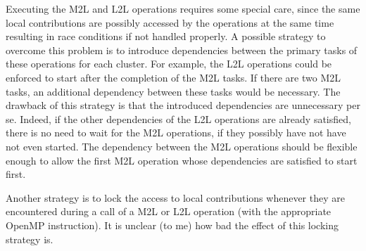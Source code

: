 \documentclass[a4paper,11pt]{article}
\theoremstyle{plain}
\theoremstyle{definition}
\theoremstyle{remark}
\begin{document}
Executing the M2L and L2L operations requires some special care, since the same local contributions are possibly accessed by the operations at the same time resulting in race conditions if not handled properly. A possible strategy to overcome this problem is to introduce dependencies between the primary tasks of these operations for each cluster. For example, the L2L operations could be enforced to start after the completion of the M2L tasks. If there are two M2L tasks, an additional dependency between these tasks would be necessary. The drawback of this strategy is that the introduced dependencies are unnecessary per se. Indeed, if the other dependencies of the L2L operations are already satisfied, there is no need to wait for the M2L operations, if they possibly have not have not even started. The dependency between the M2L operations should be flexible enough to allow the first M2L operation whose dependencies are satisfied to start first.

Another strategy is to lock the access to local contributions whenever they are encountered during a call of a M2L or
L2L operation (with the appropriate OpenMP instruction). It is unclear (to me) how bad the effect of this locking strategy is. 
\end{document}
